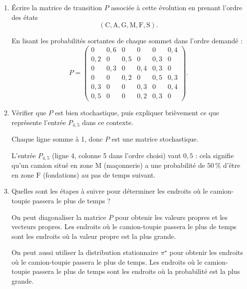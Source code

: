 \medskip
\begin{enumerate}[label=\alph*), itemsep=0.6em]
  \item Écrire la matrice de transition $P$ associée à cette évolution en prenant l'ordre des états
  \[
  (\mathrm{C},\mathrm{A},\mathrm{G},\mathrm{M},\mathrm{F},\mathrm{S}).
  \]

\begin{solution}
En lisant les probabilités sortantes de chaque sommet dans l'ordre demandé :
\[
P=
\begin{pmatrix}
0   & 0{,}6 & 0   & 0   & 0   & 0{,}4 \\
0{,}2 & 0   & 0{,}5 & 0   & 0{,}3 & 0   \\
0   & 0{,}3 & 0   & 0{,}4 & 0{,}3 & 0   \\
0   & 0   & 0{,}2 & 0   & 0{,}5 & 0{,}3 \\
0{,}3 & 0   & 0   & 0{,}3 & 0   & 0{,}4 \\
0{,}5 & 0   & 0   & 0{,}2 & 0{,}3 & 0
\end{pmatrix}.
\]
\end{solution}

  \item Vérifier que $P$ est bien stochastique, puis expliquer brièvement ce que représente l'entrée $P_{4,5}$ dans ce contexte.

\begin{solution}
Chaque ligne somme à 1, donc $P$ est une matrice stochastique.

L'entrée $P_{4,5}$ (ligne 4, colonne 5 dans l'ordre choisi) vaut $0{,}5$ : cela signifie qu'un camion situé en zone $\mathrm{M}$ (maçonnerie) a une probabilité de $50\,\%$ d'être en zone $\mathrm{F}$ (fondations) au pas de temps suivant.
\end{solution}

\item Quelles sont les étapes à suivre pour déterminer les endroits où le camion-toupie passera le plus de temps ?

\begin{solution}
On peut diagonaliser la matrice $P$ pour obtenir les valeurs propres et les vecteurs propres. Les endroits où le camion-toupie passera le plus de temps sont les endroits où la valeur propre est la plus grande.

On peut aussi utiliser la distribution stationnaire $\pi^\star$ pour obtenir les endroits où le camion-toupie passera le plus de temps. Les endroits où le camion-toupie passera le plus de temps sont les endroits où la probabilité est la plus grande.
\end{solution}

\end{enumerate}


